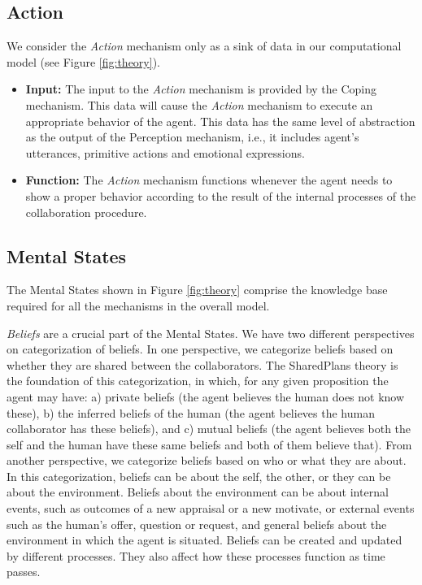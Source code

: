 \documentclass[12pt]{report}
\begin{document}
\subsection{Action}

We consider the \textit{Action} mechanism only as a sink of data in our
computational model (see Figure \ref{fig:theory}).

\begin{itemize}
  \item \textbf{Input:} The input to the \textit{Action} mechanism is provided by
  the Coping mechanism. This data will cause the \textit{Action} mechanism to
  execute an appropriate behavior of the agent. This data has the same level of
  abstraction as the output of the Perception mechanism, i.e., it includes agent's
  utterances, primitive actions and emotional expressions.
  
  \item \textbf{Function:} The \textit{Action} mechanism functions whenever the
  agent needs to show a proper behavior according to the result of the internal
  processes of the collaboration procedure.
\end{itemize}

\subsection{Mental States}
\label{sec:mental-states}
The Mental States shown in Figure \ref{fig:theory} comprise the knowledge
base required for all the mechanisms in the overall model.

\textit{Beliefs} are a crucial part of the Mental States. We have two different
perspectives on categorization of beliefs. In one perspective, we categorize
beliefs based on whether they are shared between the collaborators. The
SharedPlans \cite{grosz:plans-discourse} theory is the foundation of this
categorization, in which, for any given proposition the agent may have: a)
private beliefs (the agent believes the human does not know these), b) the
inferred beliefs of the human (the agent believes the human collaborator has
these beliefs), and c) mutual beliefs (the agent believes both the self and the
human have these same beliefs and both of them believe that). From another
perspective, we categorize beliefs based on who or what they are about. In this
categorization, beliefs can be about the self, the other, or they can be about
the environment. Beliefs about the environment can be about internal events,
such as outcomes of a new appraisal or a new motivate, or external events such
as the human's offer, question or request, and general beliefs about the
environment in which the agent is situated. Beliefs can be created and updated
by different processes. They also affect how these processes function as time
passes.
\end{document}
